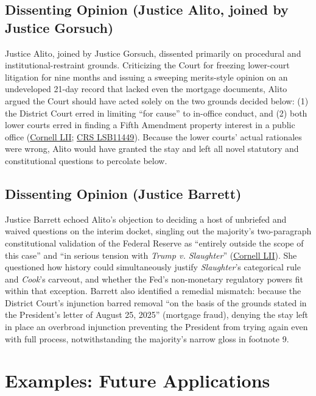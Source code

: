 \documentclass[12pt]{article}
\begin{document}
\subsection{Dissenting Opinion (Justice Alito, joined by Justice Gorsuch)}

Justice Alito, joined by Justice Gorsuch, dissented primarily on procedural and institutional-restraint grounds. Criticizing the Court for freezing lower-court litigation for nine months and issuing a sweeping merits-style opinion on an undeveloped 21-day record that lacked even the mortgage documents, Alito argued the Court should have acted solely on the two grounds decided below: (1) the District Court erred in limiting ``for cause'' to in-office conduct, and (2) both lower courts erred in finding a Fifth Amendment property interest in a public office (\href{https://www.law.cornell.edu/supremecourt/text/25A312}{Cornell LII}; \href{https://www.everycrsreport.com/reports/LSB11449.html}{CRS LSB11449}). Because the lower courts' actual rationales were wrong, Alito would have granted the stay and left all novel statutory and constitutional questions to percolate below.

\subsection{Dissenting Opinion (Justice Barrett)}

Justice Barrett echoed Alito's objection to deciding a host of unbriefed and waived questions on the interim docket, singling out the majority's two-paragraph constitutional validation of the Federal Reserve as ``entirely outside the scope of this case'' and ``in serious tension with \textit{Trump v. Slaughter}'' (\href{https://www.law.cornell.edu/supremecourt/text/25A312}{Cornell LII}). She questioned how history could simultaneously justify \textit{Slaughter}'s categorical rule and \textit{Cook}'s carveout, and whether the Fed's non-monetary regulatory powers fit within that exception. Barrett also identified a remedial mismatch: because the District Court's injunction barred removal ``on the basis of the grounds stated in the President's letter of August 25, 2025'' (mortgage fraud), denying the stay left in place an overbroad injunction preventing the President from trying again even with full process, notwithstanding the majority's narrow gloss in footnote 9.

\section{Examples: Future Applications}
\end{document}
